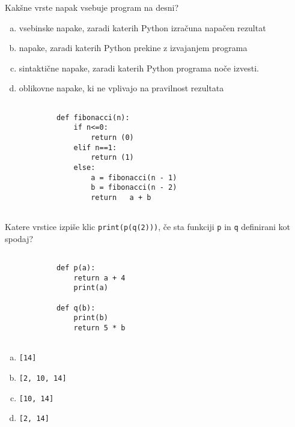 \documentclass[arhiv, 10pt]{../izpit}
\newcommand{\inlinepy}[1]{\texttt{#1}}
\begin{document}
        \naloga*
        \begin{multicols}{2}
        \noindent
        Kakšne vrste napak vsebuje program na desni?

        \begin{enumerate}[(a)]
\item vsebinske napake, zaradi katerih Python izračuna napačen rezultat
\item napake, zaradi katerih Python prekine z izvajanjem programa
\item sintaktične napake, zaradi katerih Python programa noče izvesti.
\item oblikovne napake, ki ne vplivajo na pravilnost rezultata
\end{enumerate}

        \columnbreak

        \begin{verbatim}
        
            def fibonacci(n):
                if n<=0:
                    return (0)
                elif n==1:
                    return (1)
                else:
                    a = fibonacci(n - 1)
                    b = fibonacci(n - 2)
                    return   a + b
            
        \end{verbatim}

        \end{multicols}

    
        \naloga*
        Katere vrstice izpiše klic \inlinepy{print(p(q(2)))}, če sta funkciji \inlinepy{p} in \inlinepy{q} definirani kot spodaj?

        \begin{multicols}{2}
        \begin{verbatim}
        
            def p(a):
                return a + 4
                print(a)

            def q(b):
                print(b)
                return 5 * b
        
        \end{verbatim}

        \begin{enumerate}[(a)]
\item \inlinepy{[14]}
\item \inlinepy{[2, 10, 14]}
\item \inlinepy{[10, 14]}
\item \inlinepy{[2, 14]}
\end{enumerate}

        \end{multicols}
    
\end{document}
